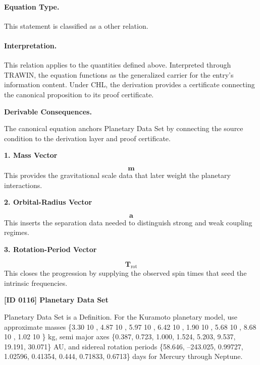 \paragraph{Equation Type.}
This statement is classified as a other relation.

\paragraph{Interpretation.}
This relation applies to the quantities defined above. Interpreted through TRAWIN, the equation functions as the generalized carrier for the entry’s information content. Under CHL, the derivation provides a certificate connecting the canonical proposition to its proof certificate.

\par\vspace{0.35em}
\noindent\textbf{Derivable Consequences.}\quad
\begingroup
\footnotesize
\raggedright
The canonical equation anchors Planetary Data Set by connecting the source condition to the derivation layer and proof certificate.
\par\endgroup

\noindent\textbf{1. Mass Vector}\par
\[
\mathbf{m}
\]
\noindent This provides the gravitational scale data that later weight the planetary interactions.\par
\noindent\textbf{2. Orbital-Radius Vector}\par
\[
\mathbf{a}
\]
\noindent This inserts the separation data needed to distinguish strong and weak coupling regimes.\par
\noindent\textbf{3. Rotation-Period Vector}\par
\[
\mathbf{T}_{\mathrm{rot}}
\]
\noindent This closes the progression by supplying the observed spin times that seed the intrinsic frequencies.\par

\clearpage
\noindent\textbf{[ID 0116] Planetary Data Set}\par
\vspace{0.35em}
\begingroup\small
{}
Planetary Data Set is a Definition. For the Kuramoto planetary model, use approximate masses \{3.30   10  , 4.87   10  , 5.97   10  , 6.42   10  , 1.90   10  , 5.68   10  , 8.68   10  , 1.02   10  \} kg, semi major axes \{0.387, 0.723, 1.000, 1.524, 5.203, 9.537, 19.191, 30.071\} AU, and sidereal rotation periods \{58.646, --243.025, 0.99727, 1.02596, 0.41354, 0.444, 0.71833, 0.6713\} days for Mercury through Neptune.

